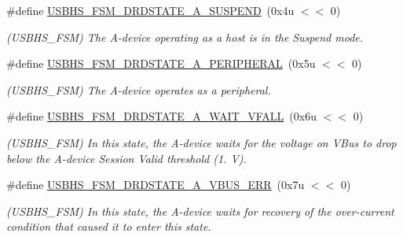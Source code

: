 \begin{DoxyCompactItemize}
\mbox{\label{group__SAMV71__USBHS_ga09a55d4fe1a019c54f2a313371c34b24}} 
\#define \mbox{\hyperlink{group__SAMV71__USBHS_ga09a55d4fe1a019c54f2a313371c34b24}{U\+S\+B\+H\+S\+\_\+\+F\+S\+M\+\_\+\+D\+R\+D\+S\+T\+A\+T\+E\+\_\+\+A\+\_\+\+S\+U\+S\+P\+E\+ND}}~(0x4u $<$$<$ 0)
\begin{DoxyCompactList}\small\item\em (U\+S\+B\+H\+S\+\_\+\+F\+SM) The A-\/device operating as a host is in the Suspend mode. \end{DoxyCompactList}\item 
\mbox{\label{group__SAMV71__USBHS_ga554f3d0cd63ae4d1bfd0b8e20342ecd3}} 
\#define \mbox{\hyperlink{group__SAMV71__USBHS_ga554f3d0cd63ae4d1bfd0b8e20342ecd3}{U\+S\+B\+H\+S\+\_\+\+F\+S\+M\+\_\+\+D\+R\+D\+S\+T\+A\+T\+E\+\_\+\+A\+\_\+\+P\+E\+R\+I\+P\+H\+E\+R\+AL}}~(0x5u $<$$<$ 0)
\begin{DoxyCompactList}\small\item\em (U\+S\+B\+H\+S\+\_\+\+F\+SM) The A-\/device operates as a peripheral. \end{DoxyCompactList}\item 
\mbox{\label{group__SAMV71__USBHS_ga404f14a5a63ed1c48e647c177f84488c}} 
\#define \mbox{\hyperlink{group__SAMV71__USBHS_ga404f14a5a63ed1c48e647c177f84488c}{U\+S\+B\+H\+S\+\_\+\+F\+S\+M\+\_\+\+D\+R\+D\+S\+T\+A\+T\+E\+\_\+\+A\+\_\+\+W\+A\+I\+T\+\_\+\+V\+F\+A\+LL}}~(0x6u $<$$<$ 0)
\begin{DoxyCompactList}\small\item\em (U\+S\+B\+H\+S\+\_\+\+F\+SM) In this state, the A-\/device waits for the voltage on V\+Bus to drop below the A-\/device Session Valid threshold (1. V). \end{DoxyCompactList}\item 
\mbox{\label{group__SAMV71__USBHS_ga4da7b28beb231378bc2969cd48c2e7c2}} 
\#define \mbox{\hyperlink{group__SAMV71__USBHS_ga4da7b28beb231378bc2969cd48c2e7c2}{U\+S\+B\+H\+S\+\_\+\+F\+S\+M\+\_\+\+D\+R\+D\+S\+T\+A\+T\+E\+\_\+\+A\+\_\+\+V\+B\+U\+S\+\_\+\+E\+RR}}~(0x7u $<$$<$ 0)
\begin{DoxyCompactList}\small\item\em (U\+S\+B\+H\+S\+\_\+\+F\+SM) In this state, the A-\/device waits for recovery of the over-\/current condition that caused it to enter this state. \end{DoxyCompactList}\item 

\end{DoxyCompactItemize}
